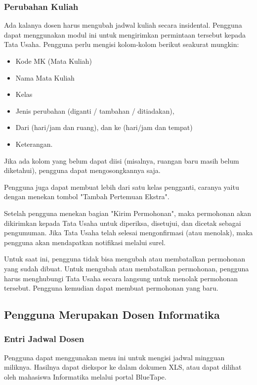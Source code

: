 \subsubsection{Perubahan Kuliah}
\label{sec:bluetape_perubahan_kuliah}
Ada kalanya dosen harus mengubah jadwal kuliah secara insidental. Pengguna dapat menggunakan modul ini untuk mengirimkan permintaan tersebut kepada Tata Usaha. Pengguna perlu mengisi kolom-kolom berikut seakurat mungkin:
\begin{itemize}
	\item Kode MK (Mata Kuliah)
	\item Nama Mata Kuliah
	\item Kelas
	\item Jenis perubahan (diganti / tambahan / ditiadakan),
	\item Dari (hari/jam dan ruang), dan ke (hari/jam dan tempat)
	\item Keterangan.
\end{itemize}

Jika ada kolom yang belum dapat diisi (misalnya, ruangan baru masih belum diketahui), pengguna dapat mengosongkannya saja.

Pengguna juga dapat membuat lebih dari satu kelas pengganti, caranya yaitu dengan menekan tombol "Tambah Pertemuan Ekstra".

Setelah pengguna menekan bagian "Kirim Permohonan", maka permohonan akan dikirimkan kepada Tata Usaha untuk diperiksa, disetujui, dan dicetak sebagai pengumuman. Jika Tata Usaha telah selesai mengonfirmasi (atau menolak), maka pengguna akan mendapatkan notifikasi melalui surel.

Untuk saat ini, pengguna tidak bisa mengubah atau membatalkan permohonan yang sudah dibuat. Untuk mengubah atau membatalkan permohonan, pengguna harus menghubungi Tata Usaha secara langsung untuk menolak permohonan tersebut. Pengguna kemudian dapat membuat permohonan yang baru.

\subsection{Pengguna Merupakan Dosen Informatika}
\label{sec:bluetape_dosen_informatika}

\subsubsection{Entri Jadwal Dosen}
\label{sec:bluetape_entri_jadwal_dosen}
Pengguna dapat menggunakan menu ini untuk mengisi jadwal mingguan miliknya. Hasilnya dapat diekspor ke dalam dokumen XLS, atau dapat dilihat oleh mahasiswa Informatika melalui portal BlueTape.

